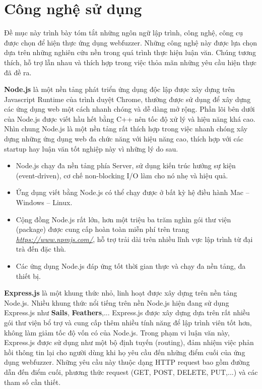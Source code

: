 \section{Công nghệ sử dụng}
Đề mục này trình bày tóm tắt những ngôn ngữ lập trình, công nghệ, công cụ được chọn để hiện thực ứng dụng webfuzzer. Những công nghệ này được lựa chọn dựa trên những nghiên cứu nền trong quá trình thực hiện luận văn. Chúng tương thích, hỗ trợ lẫn nhau và thích hợp trong việc thỏa mãn những yêu cầu hiện thực đã đề ra.\par
\textbf{Node.js} là một nền tảng phát triển ứng dụng độc lập được xây dựng trên Javascript Runtime của trình duyệt Chrome, thường được sử dụng để xây dựng các ứng dụng web một cách nhanh chóng và dễ dàng mở rộng. Phần lõi bên dưới của Node.js được viết hầu hết bằng C++ nên tốc độ xử lý và hiệu năng khá cao. Nhìn chung Node.js là một nền tảng rất thích hợp trong việc nhanh chóng xây dựng những ứng dụng web đa chức năng với hiệu năng cao, thích hợp với các startup hay luận văn tốt nghiệp này vì những lý do sau.
\begin{itemize}
    \item Node.js chạy đa nền tảng phía Server, sử dụng kiến trúc hướng sự kiện (event-driven), cơ chế non-blocking I/O làm cho nó nhẹ và hiệu quả.
    \item Ứng dụng viết bằng Node.js có thể chạy được ở bất kỳ hệ điều hành Mac – Windows – Linux.
    \item Cộng đồng Node.js rất lớn, hơn một triệu ba trăm nghìn gói thư viện (package) được cung cấp hoàn toàn miễn phí trên trang \href{https://www.npmjs.com/}{\textit{https://www.npmjs.com/}}, hỗ trợ trải dài trên nhiều lĩnh vực lập trình từ đại trà đến đặc thù.
    \item Các ứng dụng Node.js đáp ứng tốt thời gian thực và chạy đa nền tảng, đa thiết bị.
\end{itemize}
\textbf{Express.js} là một khung thức nhỏ, linh hoạt được xây dựng trên nền tảng Node.js. Nhiều khung thức nổi tiếng trên nền Node.js hiện đang sử dụng Express.js như \textbf{Sails}, \textbf{Feathers},... Express.js được xây dựng dựa trên rất nhiều gói thư viện bổ trợ và cung cấp thêm nhiều tính năng để lập trình viên tốt hơn, không làm giảm tốc độ vốn có của Node.js. Trong phạm vi luận văn này, Express.js được sử dụng như một bộ định tuyến (routing), đảm nhiệm việc phản hồi thông tin lại cho người dùng khi họ yêu cầu đến những điểm cuối của ứng dụng webfuzzer. Những yêu cầu này thuộc dạng HTTP request bao gồm đường dẫn đến điểm cuối, phương thức request (GET, POST, DELETE, PUT,...) và các tham số cần thiết. \par
